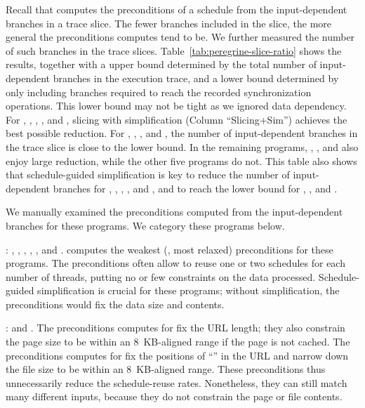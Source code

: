 Recall that \peregrine computes the preconditions of a schedule from
the input-dependent branches in a trace slice.  The
fewer branches included in the slice, the more general the preconditions
\peregrine computes tend to be.  We further measured the number of such
branches in the trace slices.  Table~\ref{tab:peregrine-slice-ratio} shows the
results, together with a upper bound determined by the total number of
input-dependent branches in the execution trace, and a lower bound
determined by only including branches required to reach the recorded
synchronization operations.  This lower bound may not be tight as we ignored data
dependency.  For \barnes, \fft, \blackscholes, \swaptions, and
\streamcluster, slicing with simplification (Column ``Slicing+Sim'')
achieves the best possible reduction.  For \pbzip, \aget, \pfscan, and \luc, the
number of input-dependent branches in the trace slice is close to the
lower bound.  In the remaining programs, \apache, \fmm, and \cholesky
also enjoy large reduction, while the other five programs do not.  This table
also shows that schedule-guided simplification is key to reduce the
number of input-dependent branches for \pbzip, \fft, \luc, \blackscholes, 
and \swaptions,
and to reach the lower bound for \blackscholes, \swaptions, and \streamcluster.


We manually examined the preconditions \peregrine computed from the
input-dependent branches for these programs.  We category these programs
below.

: \pbzip, \fft, \luc, \blackscholes, \swaptions,
  and \streamcluster. \peregrine computes the weakest (\ie, most relaxed) preconditions
  for these programs.  The preconditions often allow \peregrine to reuse
  one or two schedules for each number of threads, putting no
   or few constraints on the data processed.
  Schedule-guided simplification is crucial for
  these programs; without simplification, the preconditions
  would fix the data size and contents.

: \apache and \aget. The
  preconditions \peregrine computes for \apache fix the URL length; they also
  constrain the page size to be within an 8~KB-aligned range if
    the page is not cached.  The preconditions \peregrine computes for \aget fix
    the positions of ``\vv{/}'' in the URL and narrow down the file size
    to be within an 8~KB-aligned range.  These preconditions thus
      unnecessarily reduce the schedule-reuse rates.  Nonetheless, they
      can still match many different inputs, because they do not constrain
      the page or file contents.

